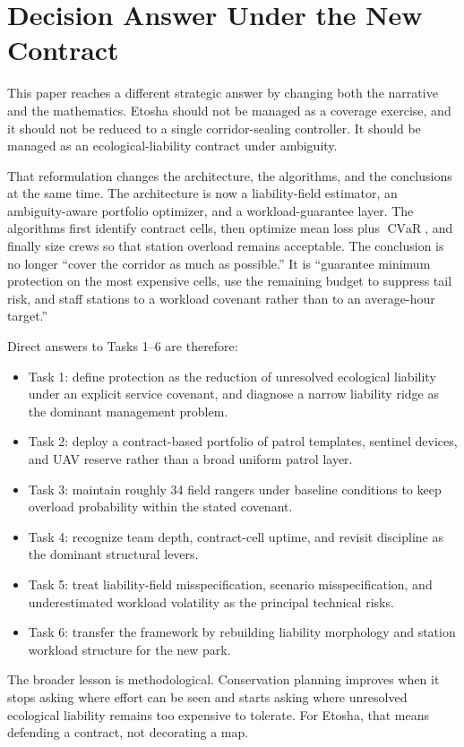 \section{Decision Answer Under the New Contract}
This paper reaches a different strategic answer by changing both the narrative and the mathematics. Etosha should not be managed as a coverage exercise, and it should not be reduced to a single corridor-sealing controller. It should be managed as an ecological-liability contract under ambiguity.

That reformulation changes the architecture, the algorithms, and the conclusions at the same time. The architecture is now a liability-field estimator, an ambiguity-aware portfolio optimizer, and a workload-guarantee layer. The algorithms first identify contract cells, then optimize mean loss plus \(\operatorname{CVaR}\), and finally size crews so that station overload remains acceptable. The conclusion is no longer ``cover the corridor as much as possible.'' It is ``guarantee minimum protection on the most expensive cells, use the remaining budget to suppress tail risk, and staff stations to a workload covenant rather than to an average-hour target.''

Direct answers to Tasks 1--6 are therefore:
\begin{itemize}
  \item Task 1: define protection as the reduction of unresolved ecological liability under an explicit service covenant, and diagnose a narrow liability ridge as the dominant management problem.
  \item Task 2: deploy a contract-based portfolio of patrol templates, sentinel devices, and UAV reserve rather than a broad uniform patrol layer.
  \item Task 3: maintain roughly 34 field rangers under baseline conditions to keep overload probability within the stated covenant.
  \item Task 4: recognize team depth, contract-cell uptime, and revisit discipline as the dominant structural levers.
  \item Task 5: treat liability-field misspecification, scenario misspecification, and underestimated workload volatility as the principal technical risks.
  \item Task 6: transfer the framework by rebuilding liability morphology and station workload structure for the new park.
\end{itemize}

The broader lesson is methodological. Conservation planning improves when it stops asking where effort can be seen and starts asking where unresolved ecological liability remains too expensive to tolerate. For Etosha, that means defending a contract, not decorating a map.

\newpage
